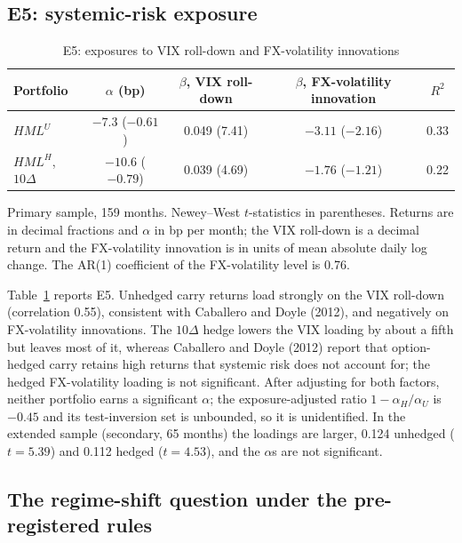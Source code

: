 \documentclass[11pt]{article}
\theoremstyle{result}
\newcommand{\HML}{\mathit{HML}}
\newcommand{\D}{\Delta}
\begin{document}
\subsection{E5: systemic-risk exposure}\label{sec:e5}

\begin{table}[t]
\centering\small
\caption{E5: exposures to VIX roll-down and FX-volatility innovations}\label{tab:e5}
\begin{tabular}{lcccc}
\toprule
Portfolio & $\alpha$ (bp) & $\beta$, VIX roll-down & $\beta$, FX-volatility innovation & $R^2$ \\
\midrule
$\HML^U$ & $-7.3$ ($-0.61$) & 0.049 (7.41) & $-3.11$ ($-2.16$) & 0.33 \\
$\HML^H$, $10\D$ & $-10.6$ ($-0.79$) & 0.039 (4.69) & $-1.76$ ($-1.21$) & 0.22 \\
\bottomrule
\end{tabular}
\par\medskip
\begin{minipage}{0.9\linewidth}\footnotesize
Primary sample, 159 months. Newey--West $t$-statistics in parentheses. Returns are in decimal fractions and $\alpha$ in bp per month; the VIX roll-down is a decimal return and the FX-volatility innovation is in units of mean absolute daily log change. The AR(1) coefficient of the FX-volatility level is 0.76.
\end{minipage}
\end{table}

Table~\ref{tab:e5} reports E5. Unhedged carry returns load strongly on the VIX roll-down (correlation 0.55), consistent with Caballero and Doyle (2012), and negatively on FX-volatility innovations. The $10\D$ hedge lowers the VIX loading by about a fifth but leaves most of it, whereas Caballero and Doyle (2012) report that option-hedged carry retains high returns that systemic risk does not account for; the hedged FX-volatility loading is not significant. After adjusting for both factors, neither portfolio earns a significant $\alpha$; the exposure-adjusted ratio $1-\alpha_H/\alpha_U$ is $-0.45$ and its test-inversion set is unbounded, so it is unidentified. In the extended sample (secondary, 65 months) the loadings are larger, 0.124 unhedged ($t=5.39$) and 0.112 hedged ($t=4.53$), and the $\alpha$s are not significant.

\subsection{The regime-shift question under the pre-registered rules}
\end{document}
